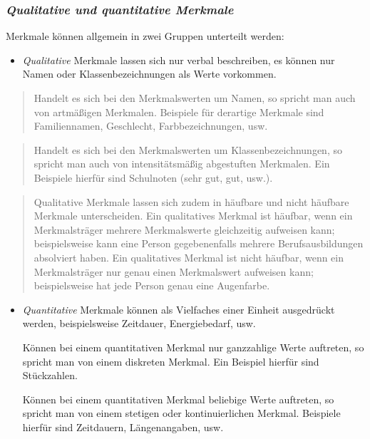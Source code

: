 \documentclass[a4paper]{article}
\providecommand*{\DUrubric}[2][class-arg]{%
  \subsubsection*{\centering\textit{\textmd{#2}}}}
\begin{document}
\DUrubric{Qualitative und quantitative Merkmale}

Merkmale können allgemein in zwei Gruppen unterteilt werden:
%
\begin{itemize}

\item \emph{Qualitative} Merkmale lassen sich nur verbal beschreiben, es können nur
Namen oder Klassenbezeichnungen als Werte vorkommen.

\end{itemize}
%
\begin{quote}

Handelt es sich bei den Merkmalswerten um Namen, so spricht man auch von
artmäßigen Merkmalen. Beispiele für derartige Merkmale sind Familiennamen,
Geschlecht, Farbbezeichnungen, usw.

\end{quote}
%
\begin{quote}

Handelt es sich bei den Merkmalswerten um Klassenbezeichnungen, so spricht man
auch von intensitätsmäßig abgestuften Merkmalen. Ein Beispiele hierfür sind
Schulnoten (\textquotedbl{}sehr gut\textquotedbl{}, \textquotedbl{}gut\textquotedbl{}, usw.).

\end{quote}
%
\begin{quote}

Qualitative Merkmale lassen sich zudem in \textquotedbl{}häufbare\textquotedbl{} und \textquotedbl{}nicht häufbare\textquotedbl{}
Merkmale unterscheiden. Ein qualitatives Merkmal ist häufbar, wenn ein
Merkmalsträger mehrere Merkmalswerte gleichzeitig aufweisen kann;
beispielsweise kann eine Person gegebenenfalls mehrere Berufsausbildungen
absolviert haben. Ein qualitatives Merkmal ist nicht häufbar, wenn ein
Merkmalsträger nur genau einen Merkmalswert aufweisen kann; beispielsweise
hat jede Person genau eine Augenfarbe.

\end{quote}


%
\begin{itemize}

\item \emph{Quantitative} Merkmale können als Vielfaches einer Einheit ausgedrückt
werden, beispielsweise Zeitdauer, Energiebedarf, usw.

Können bei einem quantitativen Merkmal nur ganzzahlige Werte auftreten, so
spricht man von einem diskreten Merkmal. Ein Beispiel hierfür sind
Stückzahlen.


Können bei einem quantitativen Merkmal beliebige Werte auftreten, so spricht
man von einem stetigen oder kontinuierlichen Merkmal. Beispiele hierfür sind
Zeitdauern, Längenangaben, usw.


\end{itemize}
\end{document}
